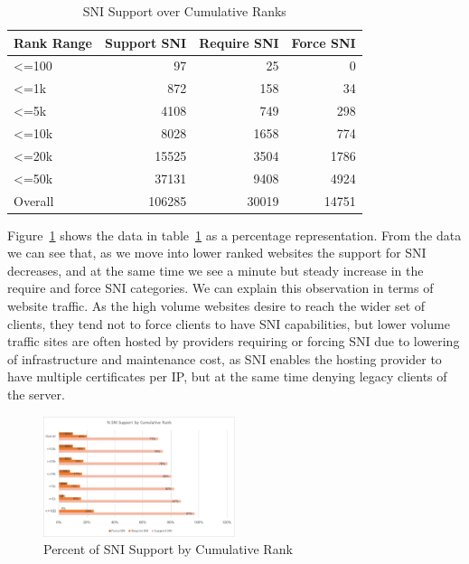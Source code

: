 \documentclass{acm_proc_article-sp}
\begin{document}
\begin{table}[htbp]
  \centering
  \caption{SNI Support over Cumulative Ranks}
    \begin{tabular}{l|r|r|r}
    \toprule
    \multicolumn{1}{l}{Rank Range} & \multicolumn{1}{l}{Support SNI} & \multicolumn{1}{l}{Require SNI} & \multicolumn{1}{l}{Force SNI} \\
    \midrule
    <=100 & 97    & 25    & 0 \\
    <=1k  & 872   & 158   & 34 \\
    <=5k  & 4108  & 749   & 298 \\
    <=10k & 8028  & 1658  & 774 \\
    <=20k & 15525 & 3504  & 1786 \\
    <=50k & 37131 & 9408  & 4924 \\
    \midrule
    Overall & 106285 & 30019 & 14751 \\
    \bottomrule
    \end{tabular}%
  \label{tab:pranks}%
\end{table}%

Figure~\ref{fig:pranks} shows the data in table~\ref{tab:pranks} as a percentage representation. From the data we can see that, as we move into lower ranked websites the support for SNI decreases, and at the same time we see a minute but steady increase in the require and force SNI categories. We can explain this observation in terms of website traffic. As the high volume websites desire to reach the wider set of clients, they tend not to force clients to have SNI capabilities, but lower volume traffic sites are often hosted by providers requiring or forcing SNI due to lowering of infrastructure and maintenance cost, as SNI enables the hosting provider to have multiple certificates per IP, but at the same time denying legacy clients of the server.

\begin{figure}[htbp]
\center
\includegraphics[width=0.5\textwidth]{by_incremental_ranks}
\caption{Percent of SNI Support by Cumulative Rank}
\label{fig:pranks}
\end{figure}
\end{document}
